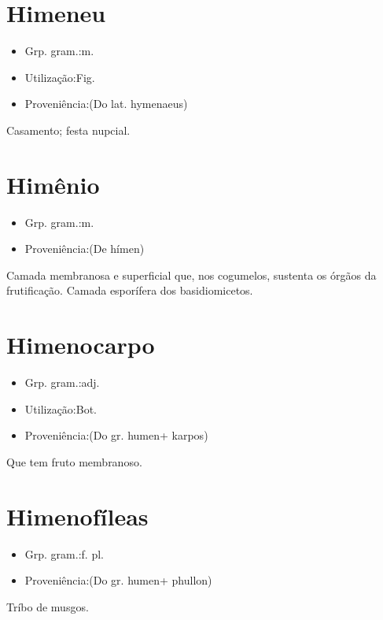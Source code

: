 \documentclass{article}
\begin{document}
\section{Himeneu}
\begin{itemize}
\item {Grp. gram.:m.}
\end{itemize}
\begin{itemize}
\item {Utilização:Fig.}
\end{itemize}
\begin{itemize}
\item {Proveniência:(Do lat. \textunderscore hymenaeus\textunderscore )}
\end{itemize}
Casamento; festa nupcial.
\section{Himênio}
\begin{itemize}
\item {Grp. gram.:m.}
\end{itemize}
\begin{itemize}
\item {Proveniência:(De \textunderscore hímen\textunderscore )}
\end{itemize}
Camada membranosa e superficial que, nos cogumelos, sustenta os órgãos da frutificação.
Camada esporífera dos basidiomicetos.
\section{Himenocarpo}
\begin{itemize}
\item {Grp. gram.:adj.}
\end{itemize}
\begin{itemize}
\item {Utilização:Bot.}
\end{itemize}
\begin{itemize}
\item {Proveniência:(Do gr. \textunderscore humen\textunderscore  + \textunderscore karpos\textunderscore )}
\end{itemize}
Que tem fruto membranoso.
\section{Himenofíleas}
\begin{itemize}
\item {Grp. gram.:f. pl.}
\end{itemize}
\begin{itemize}
\item {Proveniência:(Do gr. \textunderscore humen\textunderscore  + \textunderscore phullon\textunderscore )}
\end{itemize}
Tríbo de musgos.
\end{document}
